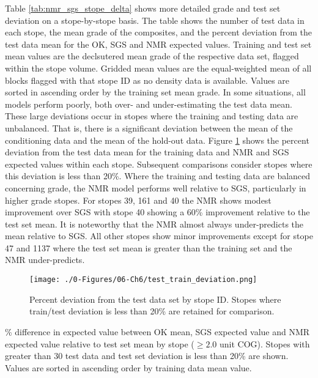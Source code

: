 Table \ref{tab:nmr_sgs_stope_delta} shows more detailed grade and test set deviation on a stope-by-stope basis. The table shows the number of test data in each stope, the mean grade of the composites, and the percent deviation from the test data mean for the \gls{OK}, \gls{SGS} and \gls{NMR} expected values. Training and test set mean values are the declsutered mean grade of the respective data set, flagged within the stope volume. Gridded mean values are the equal-weighted mean of all blocks flagged with that stope ID as no density data is available. Values are sorted in ascending order by the training set mean grade. In some situations, all models perform poorly, both over- and under-estimating the test data mean. These large deviations occur in stopes where the training and testing data are unbalanced. That is, there is a significant deviation between the mean of the conditioning data and the mean of the hold-out data. Figure \ref{fig:test_train_deviation} shows the percent deviation from the test data mean for the training data and \gls{NMR} and \gls{SGS} expected values within each stope. Subsequent comparisons consider stopes where this deviation is less than 20\%. Where the training and testing data are balanced concerning grade, the \gls{NMR} model performs well relative to \gls{SGS}, particularly in higher grade stopes. For stopes 39, 161 and 40 the \gls{NMR} shows modest improvement over \gls{SGS} with stope 40 showing a 60\% improvement relative to the test set mean. It is noteworthy that the \gls{NMR} almost always under-predicts the mean relative to \gls{SGS}. All other stopes show minor improvements except for stope 47 and 1137 where the test set mean is greater than the training set and the \gls{NMR} under-predicts.


\begin{figure}[htb!]
    \centering
    \texttt{[image: ./0-Figures/06-Ch6/test\_train\_deviation.png]}
    \caption{Percent deviation from the test data set by stope ID. Stopes where train/test deviation is less than 20\% are retained for comparison. }
    \label{fig:test_train_deviation}
\end{figure}

\begin{table}[!htb]
    \centering
    \caption{\% difference in expected value between \gls{OK} mean, \gls{SGS} expected value and \gls{NMR} expected value relative to test set mean by stope ($\geq 2.0$ unit \gls{COG}). Stopes with greater than 30 test data and test set deviation is less than 20\% are shown. Values are sorted in ascending order by training data mean value.}
    \resizebox{0.9\width}{!}{}
    \label{tab:nmr_sgs_stope_delta}
\end{table}

